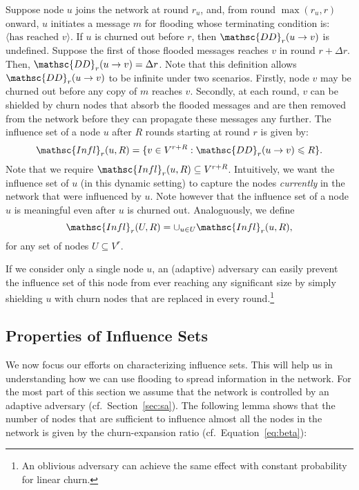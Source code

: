 \documentclass[leqno,11pt]{article}
\newcommand{\msg}[1]{\langle#1\rangle}
\renewcommand{\le}{\leqslant}
\newcommand{\dd}{{\mathsc{DD}}}
\newcommand{\infl}{{\mathsc{Infl}}}
\begin{document}
Suppose node $u$ joins the network at round $r_u$, and,
from round $\max(r_u, r)$ onward, $u$ initiates a message $m$ for flooding whose
terminating condition is: {\sc $\msg{\text{has reached $v$}}$}. If $u$ is churned out before
$r$, then $\dd_r(u \to v)$ is undefined. Suppose  the first of those flooded
messages reaches $v$ in round $r+\Delta r$. Then, $\dd_r(u \to v) = \Delta r$.
Note that this definition allows $\dd_r(u \to v)$ to be infinite under two
scenarios. Firstly, node $v$ may be churned out before any copy of $m$ reaches
$v$. Secondly, at each round, $v$ can be shielded by churn nodes that absorb the
flooded messages and are then removed from the network before they can propagate
these messages any further. The influence set of a node $u$ after $R$ rounds
starting at round $r$ is given by: 
\begin{equation*}\infl_r(u, R) = \{v \in V^{r+R} : \dd_r(u \to v) \le R \}.
\end{equation*}
Note that we require  $\infl_r(u, R) \subseteq V^{r+R}$. Intuitively, we want
the influence set of $u$ (in this dynamic setting) to capture the nodes
\emph{currently} in the network that were influenced by $u$.
Note however  that the influence set of a node $u$ is meaningful even after $u$ is churned out.
Analoguously, we define 
\begin{equation*}\infl_r(U,R) = \cup_{u \in U} \infl_r(u,R),\end{equation*}
for any set of nodes $U\subseteq V^r$.


If we consider only a single node $u$, an (adaptive) adversary can easily prevent the
influence set of this node from ever reaching any significant size by simply
shielding $u$ with churn nodes that are replaced in every round.\footnote{An
oblivious adversary can achieve the same effect with constant probability for
linear churn.}  


\subsection{Properties of Influence Sets}
We now focus our efforts on characterizing influence sets. This will help us in understanding how we can use flooding to spread information in the network.
For the most part of this section we assume that the network is controlled by an
adaptive adversary (cf.\ Section~\ref{sec:sa}).
The following lemma shows that the number of nodes that are sufficient to influence almost all the nodes in the network is given by the churn-expansion ratio (cf.\ Equation\ \eqref{eq:beta}):
\end{document}

